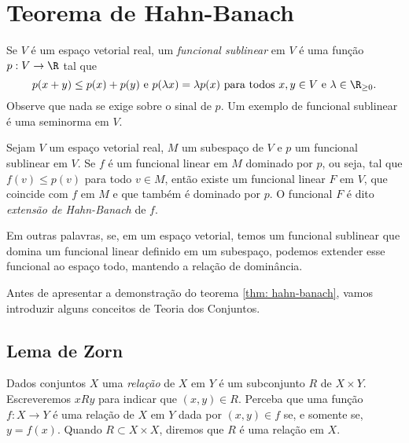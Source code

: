 \section{Teorema de Hahn-Banach}

Se \( V \) é um espaço vetorial real, um \emph{funcional sublinear} em \( V \) é uma função \( p : V \to \R \) tal que \[
    p ( x + y ) \leq p(x) + p(y) \text{ e } p(\lambda x) = \lambda p(x) \text{ para todos \( x, y \in V \) e \( \lambda \in \R_{ \geq 0 } \)}
.\]
Observe que nada se exige sobre o sinal de \( p \).
Um exemplo de funcional sublinear é uma seminorma em \( V \).

\begin{teo}
    \label{thm: hahn-banach}
    Sejam \( V \) um espaço vetorial real, \( M \) um subespaço de \( V \) e \( p \) um funcional sublinear em \( V \).
    Se \( f \) é um funcional linear em \( M \) dominado por \( p \), ou seja, tal que \( f(v) \leq p(v) \) para todo \( v \in M \), então existe um funcional linear \( F \) em \( V \), que coincide com \( f \) em \( M \) e que também é dominado por \( p \).
    O funcional \( F \) é dito \emph{extensão de Hahn-Banach} de \( f \).
\end{teo}

Em outras palavras, se, em um espaço vetorial, temos um funcional sublinear que domina um funcional linear definido em um subespaço, podemos extender esse funcional ao espaço todo, mantendo a relação de dominância.

Antes de apresentar a demonstração do teorema \ref{thm: hahn-banach}, vamos introduzir alguns conceitos de Teoria dos Conjuntos.


\subsection{Lema de Zorn}

Dados conjuntos \( X \) uma \emph{relação} de \( X \) em \( Y \) é um subconjunto \( R \) de \( X \times Y \). 
Escreveremos \( x R y \) para indicar que \( ( x, y ) \in R \).
Perceba que uma função \( f : X \to Y \) é uma relação de \( X \) em \( Y \) dada por \( ( x, y ) \in f \) se, e somente se, \( y = f(x) \).
Quando \( R \subset X \times X \), diremos que \( R \) é uma relação em \( X \).

